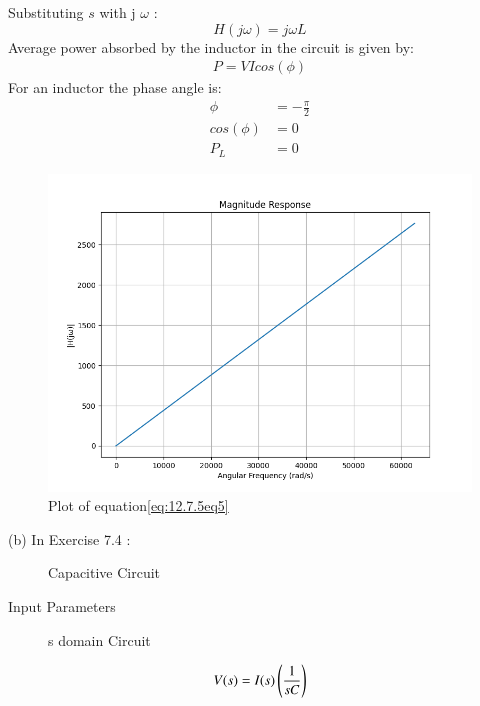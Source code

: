 \documentclass[journal,12pt,onecolumn]{IEEEtran}
\theoremstyle{remark}
\begin{document}
Substituting $s$ with j $\omega$ :
\begin{equation}
	H(j\omega) = j\omega L\label{eq:12.7.5eq5}
\end{equation}
Average power absorbed by the inductor in the circuit is given by:
\begin{align}
	P=VIcos(\phi) \label{eq:12.7.5eq6}
\end{align}
For an inductor the phase angle is:
\begin{align}
	\phi &= -\frac{\pi}{2}\label{eq:12.7.5eq7}\\
	cos(\phi) &= 0\label{eq:12.7.5eq8}\\
	P_L &= 0\label{eq:12.7.5eq9}
\end{align}	
\begin{figure}[h!]
  \centering
  \includegraphics[width=\columnwidth]{figs/plot1.png}
  \caption{Plot of equation\eqref{eq:12.7.5eq5}}
  \label{}
\end{figure}
(b) In Exercise 7.4 :
\begin{figure}[h]
	\centering
	
	\caption{Capacitive Circuit}
	\label{}
\end{figure}
\begin{table}[h]
 	\centering
 	\resizebox{6 cm}{!}{
 		
 	}
 	\vspace{6 pt}
 	\caption{Input Parameters}
 	\label{} 
 \end{table} 
\begin{figure}[h!]
	\centering
	
	\caption{s domain Circuit}
	\label{}
\end{figure}
\begin{align}
        V(s) = I(s)\left(\frac{1}{sC}\right)\label{eq:12.7.5eq10}
 \end{align}
\end{document}
